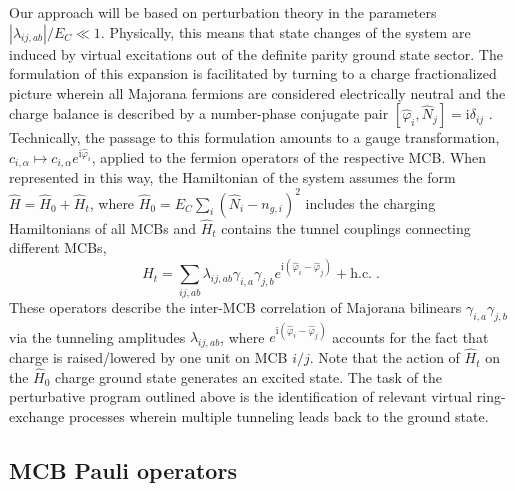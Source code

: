 \documentclass[twocolumn,floats,prx,showpacs]{revtex4-1}
\begin{document}
Our approach will be based on perturbation theory in the parameters $|\lambda_{ij,ab}|/E_C \ll 1$. Physically, this means that state changes of the system are induced by virtual excitations out of the definite parity ground state sector. The formulation of this expansion is facilitated by turning to a charge fractionalized picture wherein all Majorana fermions are considered electrically neutral and the charge balance is described by a number-phase conjugate pair $[\hat\varphi_i,\hat N_j] ={\mathrm i}\delta_{ij}$ \cite{Fu2010,Altland2013,Beri2013}. Technically, the passage to this formulation amounts to a gauge transformation, $c_{i,\alpha} \mapsto c_{i,\alpha} e^{\mathrm i\hat\varphi_i}$, applied to the fermion operators of the respective MCB. When represented in this way, the Hamiltonian of the system assumes the form    
$\hat H=\hat  H_0 +  \hat H_t$,
where $\hat H_0=E_C \sum_i (\hat N_i-n_{g,i})^2$ includes the charging Hamiltonians of all MCBs and $\hat H_t$ contains the tunnel couplings connecting different MCBs,
\begin{equation}\label{eq:V}
 \hat H_t=\sum_{ij,ab} \lambda_{ij,ab} \gamma_{i,a} \gamma_{j,b} e^{\mathrm i(\hat \varphi_i - \hat \varphi_j)} +\mathrm{h.c.}\;.
\end{equation}
These operators describe the inter-MCB correlation of Majorana bilinears $\gamma_{i,a} \gamma_{j,b}$ via the tunneling amplitudes $\lambda_{ij,ab}$, where  $e^{\mathrm i(\hat \varphi_i - \hat \varphi_j)}$ accounts for the fact that charge is raised/lowered by one unit on MCB $i/j$. Note that the action of $\hat H_t$ on the 
$\hat H_0$ charge ground state generates an excited state. The task of the perturbative program outlined above is the identification of relevant virtual ring-exchange processes wherein multiple tunneling leads back to the ground state.
 
\subsection{MCB Pauli operators}\label{sec2c}
\end{document}
